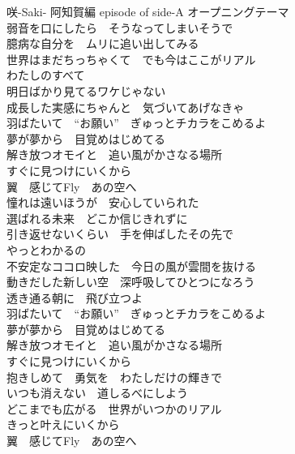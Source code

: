 
{咲-Saki- 阿知賀編 episode of side-A オープニングテーマ}
{\quad\\[-.2em]\kasho
弱音を口にしたら　そうなってしまいそうで\\
臆病な自分を　ムリに追い出してみる\\
世界はまだちっちゃくて　でも今はここがリアル\\
わたしのすべて\\

明日ばかり見てるワケじゃない\\
成長した実感にちゃんと　気づいてあげなきゃ\\

羽ばたいて　“お願い”　ぎゅっとチカラをこめるよ\\
夢が夢から　目覚めはじめてる\\
解き放つオモイと　追い風がかさなる場所\\
すぐに見つけにいくから\\
翼　感じてFly　あの空へ\\[.8em]

憧れは遠いほうが　安心していられた\\
選ばれる未来　どこか信じきれずに\\
引き返せないくらい　手を伸ばしたその先で\\
やっとわかるの\\

不安定なココロ映した　今日の風が雲間を抜ける\\
動きだした新しい空　深呼吸してひとつになろう\\
透き通る朝に　飛び立つよ\\[.8em]

羽ばたいて　“お願い”　ぎゅっとチカラをこめるよ\\
夢が夢から　目覚めはじめてる\\
解き放つオモイと　追い風がかさなる場所\\
すぐに見つけにいくから\\

抱きしめて　勇気を　わたしだけの輝きで\\
いつも消えない　道しるべにしよう\\
どこまでも広がる　世界がいつかのリアル\\
きっと叶えにいくから\\
翼　感じてFly　あの空へ
}
